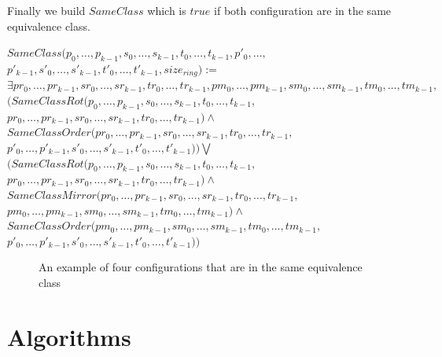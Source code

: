 \documentclass{article}
\begin{document}
\noindent Finally we build $SameClass$ which is $true$ if both configuration are in the same equivalence class.

\begin{center}
    
    $SameClass(p_{0}, \dots, p_{k-1}, s_{0}, \dots, s_{k-1}, t_{0}, \dots, t_{k-1}, p'_{0}, \dots,$\\
    $p'_{k-1}, s'_{0}, \dots, s'_{k-1}, t'_{0}, \dots, t'_{k-1}, size_{ring}):=$\\
    $\exists pr_{0}, \dots, pr_{k-1}, sr_{0}, \dots, sr_{k-1}, tr_{0}, \dots, tr_{k-1}, pm_{0}, \dots, pm_{k-1}, sm_{0}, \dots, sm_{k-1}, tm_{0}, \dots, tm_{k-1},$\\
    $(SameClassRot(p_{0}, \dots, p_{k-1}, s_{0}, \dots, s_{k-1}, t_{0}, \dots, t_{k-1},$\\
    $pr_{0}, \dots, pr_{k-1}, sr_{0}, \dots, sr_{k-1}, tr_{0}, \dots, tr_{k-1}) \land$\\
    $SameClassOrder(pr_{0}, \dots, pr_{k-1}, sr_{0}, \dots, sr_{k-1}, tr_{0}, \dots, tr_{k-1},$\\$
    p'_{0}, \dots, p'_{k-1}, s'_{0}, \dots, s'_{k-1}, t'_{0}, \dots, t'_{k-1}))\bigvee$\\
    $(SameClassRot(p_{0}, \dots, p_{k-1}, s_{0}, \dots, s_{k-1}, t_{0}, \dots, t_{k-1},$\\
    $pr_{0}, \dots, pr_{k-1}, sr_{0}, \dots, sr_{k-1}, tr_{0}, \dots, tr_{k-1}) \land$\\
    $SameClassMirror(pr_{0}, \dots, pr_{k-1}, sr_{0}, \dots, sr_{k-1}, tr_{0}, \dots, tr_{k-1},$\\
    $pm_{0}, \dots, pm_{k-1}, sm_{0}, \dots, sm_{k-1}, tm_{0}, \dots, tm_{k-1})\land$\\
    $SameClassOrder(pm_{0}, \dots, pm_{k-1}, sm_{0}, \dots, sm_{k-1}, tm_{0}, \dots, tm_{k-1},$\\
    $p'_{0}, \dots,p'_{k-1}, s'_{0}, \dots, s'_{k-1}, t'_{0}, \dots, t'_{k-1}) )$
\end{center}

\begin{figure}[!h]
    \centering
    \def\svgscale{0.8}
    
    \caption{An example of four configurations that are in the same equivalence class}
    \label{dessinEqui}
\end{figure}

\section{Algorithms}
\end{document}
